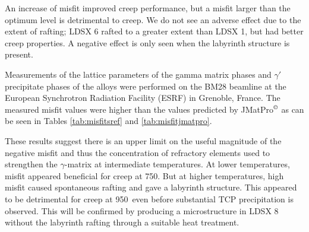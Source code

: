 An increase of misfit improved creep performance, but a misfit larger than the optimum level is detrimental to creep.  We do not see an adverse effect due to the extent of rafting; LDSX 6 rafted to a greater extent than LDSX 1, but had better creep properties.  A negative effect is only seen when the labyrinth structure is present.

Measurements of the lattice parameters of the gamma matrix phases and $\gamma'$ precipitate phases of the alloys were performed on the BM28 beamline at the European Synchrotron Radiation Facility (ESRF) in Grenoble, France.  The measured misfit values were higher than the values predicted by JMatPro$^{\copyright}$ as can be seen in Tables \ref{tab:misfitsref} and \ref{tab:misfitjmatpro}.

These results suggest there is an upper limit on the useful magnitude of the negative misfit and thus the concentration of refractory elements used to strengthen the $\gamma$-matrix at intermediate temperatures.  At lower temperatures, misfit appeared beneficial for creep at 750\celsius. But at higher temperatures, high misfit caused spontaneous rafting and gave a labyrinth structure.  This appeared to be detrimental for creep at 950\celsius\ even before substantial TCP precipitation is observed.  This will be confirmed by producing a microstructure in LDSX 8 without the labyrinth rafting through a suitable heat treatment.

